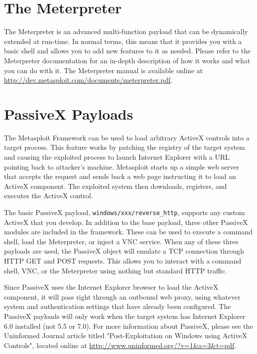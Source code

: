 \documentclass{report}
\begin{document}
\section{The Meterpreter}

\par
The Meterpreter is an advanced multi-function payload that can be dynamically
extended at run-time. In normal terms, this means that it provides you with a
basic shell and allows you to add new features to it as needed. Please refer to
the Meterpreter documentation for an in-depth description of how it works and
what you can do with it. The Meterpreter manual is available online at
\url{http://dev.metasploit.com/documents/meterpreter.pdf}.

\section{PassiveX Payloads}

\par
The Metasploit Framework can be used to load arbitrary ActiveX controls into a
target process. This feature works by patching the registry of the target system
and causing the exploited process to launch Internet Explorer with a URL
pointing back to attacker's machine. Metasploit starts up a simple web server
that accepts the request and sends back a web page instructing it to load an
ActiveX component. The exploited system then downloads, registers, and executes
the ActiveX control.

\par
The basic PassiveX payload, \texttt{windows/xxx/reverse\_http}, supports any
custom ActiveX that you develop. In addition to the base payload, three other
PassiveX modules are included in the framework. These can be used to execute a
command shell, load the Meterpreter, or inject a VNC service. When any of these
three payloads are used, the PassiveX object will emulate a TCP connection
through HTTP GET and POST requests. This allows you to interact with a command
shell, VNC, or the Meterpreter using nothing but standard HTTP traffic.

\par
Since PassiveX uses the Internet Explorer browser to load the ActiveX component,
it will pass right through an outbound web proxy, using whatever system and
authentication settings that have already been configured. The PassiveX payloads
will only work when the target system has Internet Explorer 6.0 installed (not
5.5 or 7.0). For more information about PassiveX, please see the Uninformed
Journal article titled "Post-Exploitation on Windows using ActiveX Controls",
located online at \url{http://www.uninformed.org/?v=1&a=3&t=pdf}.
\end{document}
